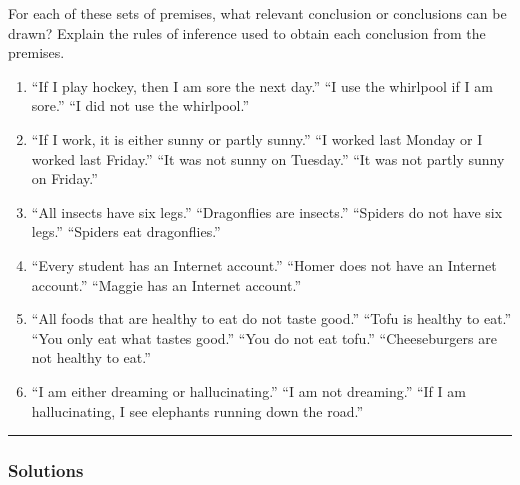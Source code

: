 \begin{question}
For each of these sets of premises, what relevant conclusion
or conclusions can be drawn? Explain the rules of inference
used to obtain each conclusion from the premises.
\begin{enumerate}
\item “If I play hockey, then I am sore the next day.” “I
use the whirlpool if I am sore.” “I did not use the
whirlpool.”
\item “If I work, it is either sunny or partly sunny.” “I
worked last Monday or I worked last Friday.” “It was
not sunny on Tuesday.” “It was not partly sunny on
Friday.”
\item “All insects have six legs.” “Dragonflies are insects.”
“Spiders do not have six legs.” “Spiders eat dragonflies.”
\item “Every student has an Internet account.” “Homer
does not have an Internet account.” “Maggie has an
Internet account.”
\item “All foods that are healthy to eat do not taste good.”
“Tofu is healthy to eat.” “You only eat what tastes
good.” “You do not eat tofu.” “Cheeseburgers are not
healthy to eat.”
\item “I am either dreaming or hallucinating.” “I am not
dreaming.” “If I am hallucinating, I see elephants running
down the road.”
\end{enumerate}
\end{question}

\par\noindent\rule{\textwidth}{0.5pt}
\subsubsection*{Solutions}

